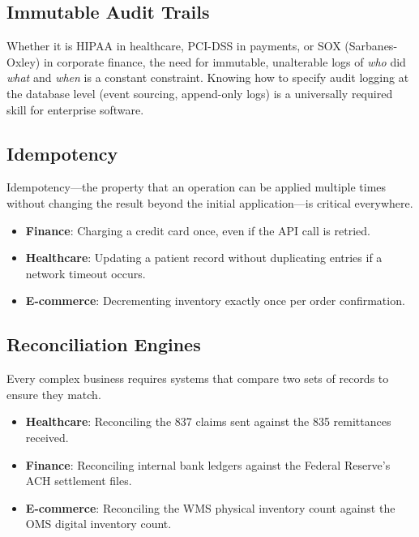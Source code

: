 \subsection{Immutable Audit Trails}\label{immutable-audit-trails}

Whether it is HIPAA in healthcare, PCI-DSS in payments, or SOX
(Sarbanes-Oxley) in corporate finance, the need for immutable,
unalterable logs of \emph{who} did \emph{what} and \emph{when} is a
constant constraint. Knowing how to specify audit logging at the
database level (event sourcing, append-only logs) is a universally
required skill for enterprise software.

\subsection{Idempotency}\label{idempotency}

Idempotency---the property that an operation can be applied multiple
times without changing the result beyond the initial application---is
critical everywhere.

\begin{itemize}
\tightlist
\item
  \textbf{Finance}: Charging a credit card once, even if the API call is
  retried.
\item
  \textbf{Healthcare}: Updating a patient record without duplicating
  entries if a network timeout occurs.
\item
  \textbf{E-commerce}: Decrementing inventory exactly once per order
  confirmation.
\end{itemize}

\subsection{Reconciliation Engines}\label{reconciliation-engines}

Every complex business requires systems that compare two sets of records
to ensure they match.

\begin{itemize}
\tightlist
\item
  \textbf{Healthcare}: Reconciling the 837 claims sent against the 835
  remittances received.
\item
  \textbf{Finance}: Reconciling internal bank ledgers against the
  Federal Reserve's ACH settlement files.
\item
  \textbf{E-commerce}: Reconciling the WMS physical inventory count
  against the OMS digital inventory count.
\end{itemize}


